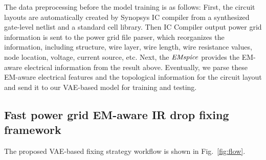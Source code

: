 The data preprocessing before the model training is as follows:
First, the circuit layouts are automatically created by Synopsys IC compiler from a synthesized gate-level netlist and a standard cell library. 
Then IC Compiler output power grid information is sent to the power grid file parser, which reorganizes the information, including structure, wire layer, wire length, wire resistance values, node location, voltage, current source, etc.
Next, the $\it{EMspice}$ provides the EM-aware electrical information from the result above.
Eventually, we parse these EM-aware electrical features and the topological information for the circuit layout and send it to our VAE-based model for training and testing. 

\begin{table}[!htbp]
	\begin{center}
		\caption{Power Grid Designs Detail}
		\label{table:pg_detail}
		\center
	\end{center}
	\vspace{-0.1in}
\end{table}




\subsection{Fast power grid EM-aware IR drop fixing framework }
\label{subsec:formulation}

The proposed VAE-based fixing strategy workflow is shown in Fig.~\ref{fig:flow}. 


